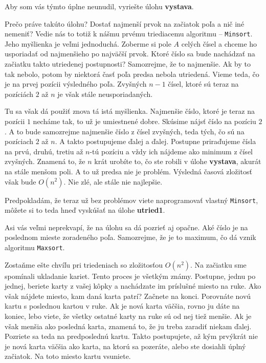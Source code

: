 \medskip

Aby som vás týmto úplne neunudil, vyriešte úlohu \textbf{vystava}.

\medskip

Prečo práve takúto úlohu? Dostať najmenší prvok na začiatok poľa a nič iné nemeniť? Vedie nás to
totiž k nášmu prvému triediacemu algoritmu -- \texttt{Minsort}. Jeho myšlienka je veľmi jednoduchá.
Zoberme si pole $A$ celých čísel a chceme ho usporiadať od najmenšieho po najväčší prvok. Ktoré
číslo sa bude nachádzať na začiatku takto utriedenej postupnosti? Samozrejme, že to najmenšie. Ak by
to tak nebolo, potom by niektorá časť poľa predsa nebola utriedená. Vieme teda, čo je na prvej
pozícii výsledného poľa. Zvyšných $n-1$ čísel, ktoré sú teraz na pozíciách $2$ až $n$ je však stále
neusporiadaných.

Tu sa však dá použiť znova tá istá myšlienka. Najmenšie číslo, ktoré je teraz na pozícii $1$ necháme
tak, to už je umiestnené dobre. Skúsime nájsť číslo na pozíciu $2$. A to bude samozrejme najmenšie
číslo z čísel zvyšných, teda tých, čo sú na pozíciach $2$ až $n$. A takto postupujeme ďalej a
ďalej. Postupne priraďujeme čísla na prvú, druhú, tretiu až $n$-tú pozíciu a vždy ich nájdeme ako
minimum z čísel zvyšných. Znamená to, že $n$ krát urobíte to, čo ste robili v úlohe
\textbf{vystava}, akurát na stále menšom poli. A to už predsa nie je problém.
Výsledná časová zložitosť však bude $O(n^2)$. Nie zlé, ale stále nie najlepšie.

\medskip

Predpokladám, že teraz už bez problémov viete naprogramovať vlastný \texttt{Minsort}, môžete si to
teda hneď vyskúšať na úlohe \textbf{utried1}.

\medskip

Asi vás veľmi neprekvapí, že na úlohu sa dá pozrieť aj opačne. Aké číslo je na poslednom mieste
zoradeného poľa. Samozrejme, že je to maximum, čo dá vznik algoritmu \texttt{Maxsort}.

\bigskip

Zostaňme ešte chvíľu pri triedeniach so zložitosťou $O(n^2)$. Na začiatku sme spomínali ukladanie
kariet. Tento proces je všetkým známy. Postupne, jednu po jednej, beriete karty z vašej kôpky a
nachádzate im príslušné miesto na ruke. Ako však nájdete miesto, kam daná karta patrí? Začnete na
konci. Porovnáte novú kartu s poslednou kartou v ruke. Ak je nová karta väčšia, rovno ju dáte na
koniec, lebo viete, že všetky ostatné karty na ruke sú od nej tiež menšie. Ak je však menšia ako
posledná karta, znamená to, že ju treba zaradiť niekam ďalej. Pozriete sa teda na predposlednú
kartu. Takto postupujete, až kým prvýkrát nie je nová karta väčšia ako karta, na ktorú sa pozeráte,
alebo ste dosiahli úplný začiatok. Na toto miesto kartu vsuniete.

